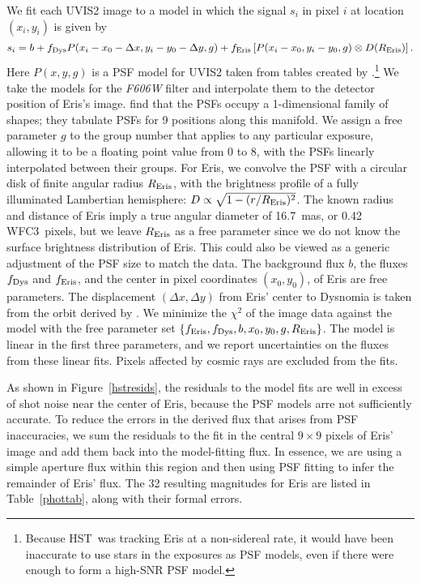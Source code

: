 \documentclass[onecolumn]{aastex631}
\newcommand{\hst}{HST}
\newcommand{\wfc}{WFC3}
\begin{document}
We fit each UVIS2 image to a model in which the signal $s_i$ in pixel $i$ at location $(x_i,y_i)$ is given by
\begin{equation}
  s_i = b + f_{\rm Dys}P(x_i-x_0-\Delta x, y_i-y_0-\Delta y,g) + f_{\rm Eris} \left[ P(x_i-x_0, y_i-y_0,g) \otimes D(R_{\rm Eris})\right].
\end{equation}
Here $P(x,y,g)$ is a PSF model for UVIS2 taken from tables created by \citet{BAG18}.\footnote{Because \hst\ was tracking Eris at a non-sidereal rate, it would have been inaccurate to use stars in the exposures as PSF models, even if there were enough to form a high-SNR PSF model.} We take the models for the {\it F606W} filter and interpolate them to the detector position of Eris's image. \citet{BAG18} find that the PSFs occupy a 1-dimensional family of shapes; they tabulate PSFs for 9 positions along this manifold. We assign a free parameter $g$ to the group number that applies to any particular exposure, allowing it to be a floating point value from 0 to 8, with the PSFs linearly interpolated between their groups. For Eris, we convolve the PSF with a circular disk of finite angular radius $R_{\rm Eris}$, with the brightness profile of a fully illuminated Lambertian hemisphere: $D \propto \sqrt{1-(r/R_{\rm Eris})^2}$. The known radius \citep{Sicardy} and distance of Eris imply a true angular diameter of 16.7~mas, or 0.42 \wfc\ pixels, but we leave $R_{\rm Eris}$ as a free parameter since we do not know the surface brightness distribution of Eris.  This could also be viewed as a generic adjustment of the PSF size to match the data. The background flux $b$, the fluxes $f_{\rm Dys}$ and $f_{\rm Eris}$, and the center in pixel coordinates $(x_0,y_0)$, of Eris are free parameters. The displacement $(\Delta x, \Delta y)$ from Eris' center to Dysnomia is taken from the orbit derived by \citet{H21}. We minimize the $\chi^2$ of the image data against the model with the free parameter set $\{f_{\rm Eris}, f_{\rm Dys}, b, x_0, y_0, g, R_{\rm Eris}\}$. The model is linear in the first three parameters, and we report uncertainties on the fluxes from these linear fits. Pixels affected by cosmic rays are excluded from the fits.

As shown in Figure~\ref{hstresids}, the residuals to the model fits are well in excess of shot noise near the center of Eris, because the PSF models arre not sufficiently accurate. To reduce the errors in the derived flux that arises from PSF inaccuracies, we sum the residuals to the fit in the central $9\times9$ pixels of Eris' image and add them back into the model-fitting flux. In essence, we are using a simple aperture flux within this region and then using PSF fitting to infer the remainder of Eris' flux. 
The 32 resulting magnitudes for Eris are listed in Table~\ref{phottab}, along with their formal errors.
\end{document}
